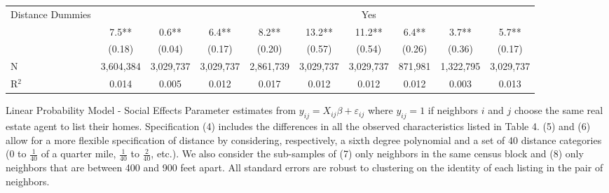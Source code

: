 \documentclass[AEJ,draftmode]{AEA}
\newcommand{\se}[1]{\footnotesize{(#1)}}
\newcommand{\fn}[1]{\footnotesize{#1}}
\begin{document}
\begin{sidewaystable}[ht]
\begin{tabular}{@{}lccccccccc@{}}
Distance Dummies                  &  &  &         &         &             &Yes &         &  &    \\\addlinespace
\multirow{2}{*}{Constant}                &7.5**    &0.6**    &6.4**    &8.2**    &13.2**   &11.2**   &6.4**    &3.7**    & 5.7**   \\
                                         &\se{0.18}&\se{0.04}&\se{0.17}&\se{0.20}&\se{0.57}&\se{0.54}&\se{0.26}&\se{0.36}&\se{0.17}\\\midrule
N          &\fn{3,604,384}&\fn{3,029,737}&\fn{3,029,737}&\fn{2,861,739}&\fn{3,029,737}&\fn{3,029,737}&\fn{871,981}&\fn{1,322,795}&\fn{3,029,737}\\
R$^2$                       &\fn{0.014}&\fn{0.005}&\fn{0.012}&\fn{0.017}&\fn{0.012}&\fn{0.012}&\fn{0.012}&\fn{0.003}&\fn{0.013}   \\\bottomrule
\end{tabular}
\begin{minipage}{.88\hsize}
{\footnotesize
    Linear Probability Model - Social Effects
    Parameter estimates from $y_{ij} = X_{ij}\beta + \varepsilon_{ij}$
    where $y_{ij} = 1$ if neighbors $i$ and $j$ choose the same real estate agent to list their homes.
    Specification (4) includes the differences in all the observed characteristics listed in Table 4. (5) and (6) allow for a more flexible specification of distance by considering, respectively, a sixth degree polynomial and a set of 40 distance categories (0 to $\frac{1}{40}$ of a quarter mile, $\frac{1}{40}$ to $\frac{2}{40}$, etc.).
    We also consider the sub-samples of (7) only neighbors in the same census block and (8) only neighbors that are between 400 and 900 feet apart.  All standard errors are robust to clustering on the identity of each listing in the pair of neighbors.}
\end{minipage}
\end{sidewaystable}
\end{document}
